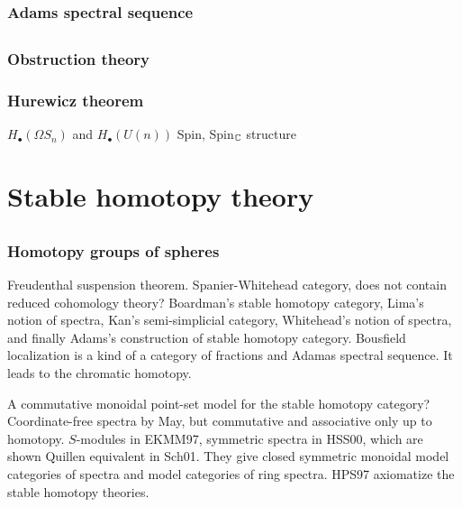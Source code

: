 \documentclass{../../large}
\begin{document}
\section{Adams spectral sequence}






\chapter{}

\section{Obstruction theory}
\section{Hurewicz theorem}
$H_\bullet(\Omega S_n)$ and $H_\bullet(U(n))$
Spin, Spin$_{\mathbb{C}}$ structure











\part{Stable homotopy theory}


\chapter{}
\section{Homotopy groups of spheres}

Freudenthal suspension theorem.
Spanier-Whitehead category, does not contain reduced cohomology theory?
Boardman's stable homotopy category, Lima's notion of spectra, Kan's semi-simplicial category, Whitehead's notion of spectra, and finally Adams's construction of stable homotopy category.
Bousfield localization is a kind of a category of fractions and Adamas spectral sequence.
It leads to the chromatic homotopy.

A commutative monoidal point-set model for the stable homotopy category?
Coordinate-free spectra by May, but commutative and associative only up to homotopy.
$S$-modules in EKMM97, symmetric spectra in HSS00, which are shown Quillen equivalent in Sch01.
They give closed symmetric monoidal model categories of spectra and model categories of ring spectra.
HPS97 axiomatize the stable homotopy theories.
\end{document}
